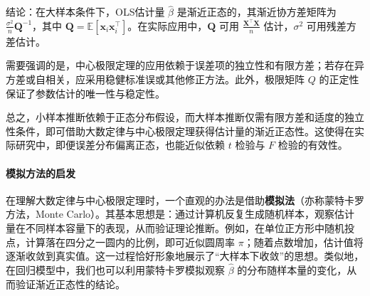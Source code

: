 结论：在大样本条件下，OLS估计量 $\hat{\beta}$ 是渐近正态的，其渐近协方差矩阵为 $\frac{\sigma^2}{n} \mathbf{Q}^{-1}$，其中 $\mathbf{Q} = \mathbb{E}[\mathbf{x}_i \mathbf{x}_i^\top]$。在实际应用中，$\mathbf{Q}$ 可用 $\frac{\mathbf{X}^\top \mathbf{X}}{n}$ 估计，$\sigma^2$ 可用残差方差估计。

需要强调的是，中心极限定理的应用依赖于误差项的独立性和有限方差；若存在异方差或自相关，应采用稳健标准误或其他修正方法。此外，极限矩阵 $Q$ 的正定性保证了参数估计的唯一性与稳定性。

总之，小样本推断依赖于正态分布假设，而大样本推断仅需有限方差和适度的独立性条件，即可借助大数定律与中心极限定理获得估计量的渐近正态性。这使得在实际研究中，即便误差分布偏离正态，也能近似依赖 $t$ 检验与 $F$ 检验的有效性。

\paragraph*{模拟方法的启发}

在理解大数定律与中心极限定理时，一个直观的办法是借助\textbf{模拟法}（亦称蒙特卡罗方法，Monte Carlo）。其基本思想是：通过计算机反复生成随机样本，观察估计量在不同样本容量下的表现，从而验证理论推断。例如，在单位正方形中随机投点，计算落在四分之一圆内的比例，即可近似圆周率 $\pi$；随着点数增加，估计值将逐渐收敛到真实值。这一过程恰好形象地展示了“大样本下收敛”的思想。类似地，在回归模型中，我们也可以利用蒙特卡罗模拟观察 $\hat{\beta}$ 的分布随样本量的变化，从而验证渐近正态性的结论。

